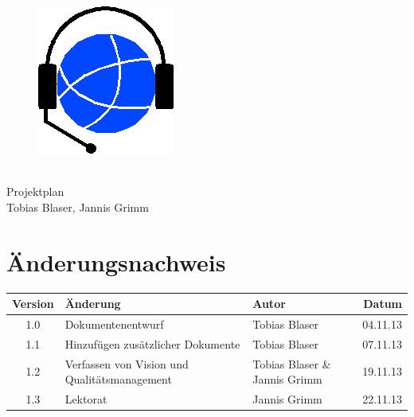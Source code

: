 
\usepackage{csvsimple}

\providecommand{\documentType}{Projektplan}
\providecommand{\versionnumber}{1.3}



\thispagestyle{empty}
\begin{titlepage}
	\begin{center}

	\vspace*{40mm}
	
	\begin{figure}[htp]
		\centering
		\includegraphics[scale=0.60]{../img/icon-js-voip.png}
	\end{figure}		
	\vspace*{20mm}
	
	{\fontsize{40}{48} \selectfont \project \\[10mm]}
	{\fontsize{40}{48} \selectfont \documentType \\[5mm]}	
	\vspace*{20mm}
	Tobias Blaser, Jannis Grimm

\end{center}
\end{titlepage}
\clearpage

\chapter*{Änderungsnachweis}
\begin{tabularx}{\textwidth}{|cXlr|} %
		\hline
		\textbf{Version} & \textbf{Änderung} & \textbf{Autor} & \textbf{Datum}\\
		\hline
		1.0 & Dokumentenentwurf & Tobias Blaser & 04.11.13\\
		1.1 & Hinzufügen zusätzlicher Dokumente & Tobias Blaser & 07.11.13\\
		1.2 & Verfassen von Vision und Qualitätsmanagement & Tobias Blaser \& Jannis Grimm & 19.11.13\\
		1.3 & Lektorat & Jannis Grimm & 22.11.13\\
		\hline
\end{tabularx}

